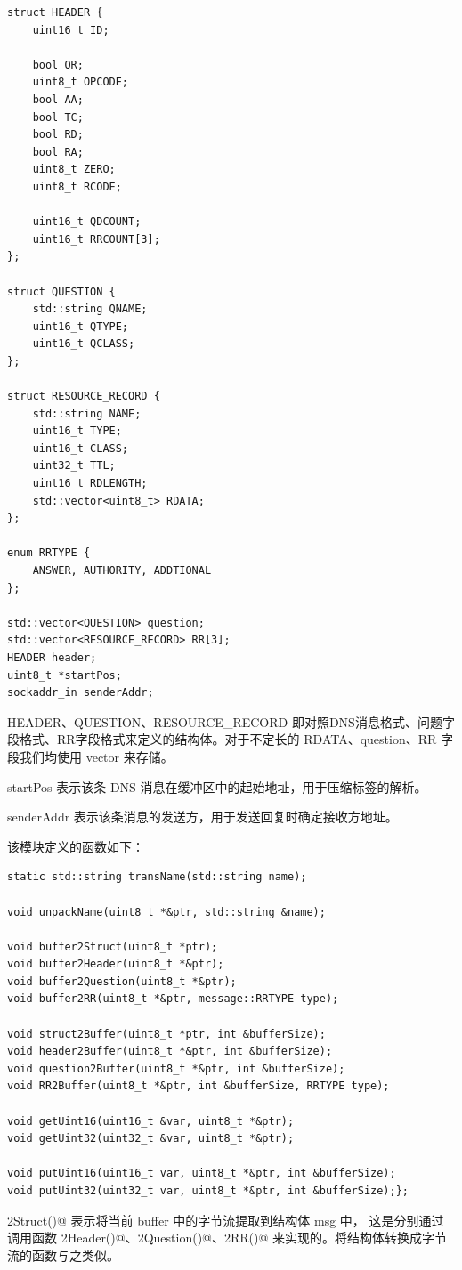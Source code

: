 \documentclass[]{article}
\begin{document}
        \begin{lstlisting}
struct HEADER {
    uint16_t ID;

    bool QR;
    uint8_t OPCODE;
    bool AA;
    bool TC;
    bool RD;
    bool RA;
    uint8_t ZERO;
    uint8_t RCODE;

    uint16_t QDCOUNT;
    uint16_t RRCOUNT[3];
};

struct QUESTION {
    std::string QNAME;
    uint16_t QTYPE;
    uint16_t QCLASS;
};        

struct RESOURCE_RECORD {
    std::string NAME;
    uint16_t TYPE;
    uint16_t CLASS;
    uint32_t TTL;
    uint16_t RDLENGTH;
    std::vector<uint8_t> RDATA;
};

enum RRTYPE {
    ANSWER, AUTHORITY, ADDTIONAL
};

std::vector<QUESTION> question;
std::vector<RESOURCE_RECORD> RR[3];
HEADER header;
uint8_t *startPos;
sockaddr_in senderAddr;
        \end{lstlisting}

        HEADER、QUESTION、RESOURCE\_RECORD 即对照DNS消息格式、问题字段格式、RR字段格式来定义的结构体。对于不定长的 RDATA、question、RR 字段我们均使用 vector 来存储。

        startPos 表示该条 DNS 消息在缓冲区中的起始地址，用于压缩标签的解析。

        senderAddr 表示该条消息的发送方，用于发送回复时确定接收方地址。

        该模块定义的函数如下：
        \begin{lstlisting}
static std::string transName(std::string name);

void unpackName(uint8_t *&ptr, std::string &name);

void buffer2Struct(uint8_t *ptr);
void buffer2Header(uint8_t *&ptr);
void buffer2Question(uint8_t *&ptr);
void buffer2RR(uint8_t *&ptr, message::RRTYPE type);

void struct2Buffer(uint8_t *ptr, int &bufferSize);
void header2Buffer(uint8_t *&ptr, int &bufferSize);
void question2Buffer(uint8_t *&ptr, int &bufferSize);
void RR2Buffer(uint8_t *&ptr, int &bufferSize, RRTYPE type);

void getUint16(uint16_t &var, uint8_t *&ptr);
void getUint32(uint32_t &var, uint8_t *&ptr);

void putUint16(uint16_t var, uint8_t *&ptr, int &bufferSize);
void putUint32(uint32_t var, uint8_t *&ptr, int &bufferSize);};
        \end{lstlisting}

        \verb@buffer2Struct()@ 表示将当前 buffer 中的字节流提取到结构体 msg 中，
        这是分别通过调用函数 \verb@buffer2Header()@、\verb@buffer2Question()@、\verb@buffer2RR()@ 来实现的。将结构体转换成字节流的函数与之类似。
\end{document}
